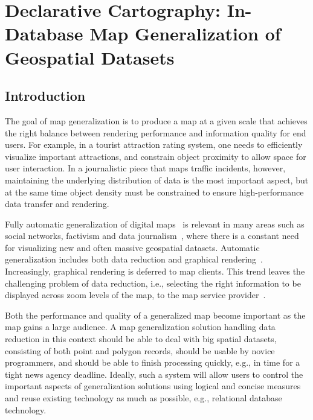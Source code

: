 \documentclass[11pt, oneside]{report}
\begin{document}
\chapter{Declarative Cartography: In-Database Map Generalization of Geospatial Datasets}
\label{chapter:cvl}
\lstset{
  language=cvl
}

\section{Introduction}
\label{sec:cvl:introduction}
The goal of map generalization is to produce a map at a given scale that achieves the right balance between rendering performance and information quality for end users. For example, in a tourist attraction rating system, one needs to efficiently visualize important attractions, and constrain object proximity to allow space for user interaction. In a journalistic piece that maps traffic incidents, however, maintaining the underlying distribution of data is the most important aspect, but at the same time object density must be constrained to ensure high-performance data transfer and rendering.

Fully automatic generalization of digital maps~\cite{sarma2012fusiontables,nutanong2012multiresolution} is relevant in many areas such as social networks, factivism and data journalism~\cite{cohen2011journalism,bono,sankaranarayanan2009twitterstand}, where there is a constant need for visualizing new and often massive geospatial datasets. Automatic generalization includes both data reduction and graphical rendering~\cite{weibel1999generalising,gruenreich1985cag}. Increasingly, graphical rendering is deferred to map clients. This trend leaves the challenging problem of data reduction, i.e., selecting the right information to be displayed across zoom levels of the map, to the map service provider~\cite{gaffuri12vectortiles}. 

Both the performance and quality of a generalized map become important as the map gains a large audience. A map generalization solution handling data reduction in this context should be able to deal with big spatial datasets, consisting of both point and polygon records, should be usable by novice programmers, and should be able to finish processing quickly, e.g., in time for a tight news agency deadline. Ideally, such a system will allow users to control the important aspects of generalization solutions using logical and concise measures and reuse existing technology as much as possible, e.g., relational database technology.
\end{document}
